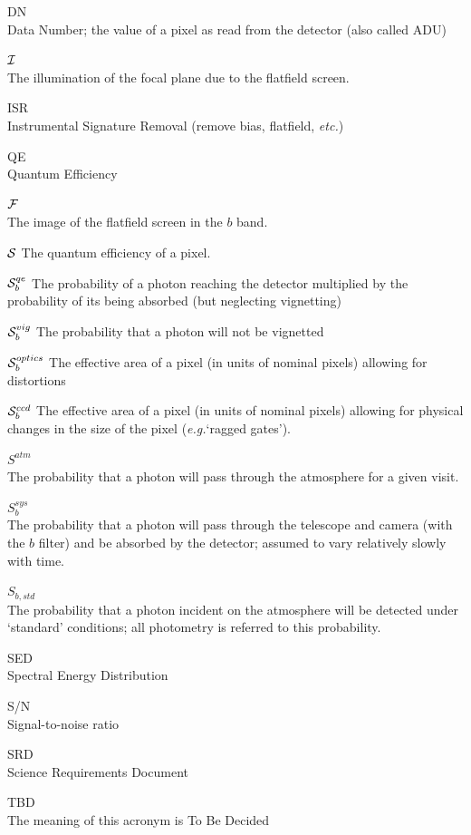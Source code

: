 \documentclass[12pt]{article}
\newcommand{\eg}{\textit{e.g.}\xspace}
\newcommand{\etc}{\textit{etc.}\xspace}
\newcommand{\Flat}{{\cal F}}
\newcommand{\screen}{{\cal I}}
\newcommand{\qe}{{\cal S}}
\begin{document}
\begin{description}
  \item{DN}\\
    Data Number; the value of a pixel as read from the detector (also called ADU)
  \item $\screen$\\
    The illumination of the focal plane due to the flatfield screen.
  \item{ISR}\\
    Instrumental Signature Removal (remove bias, flatfield, \etc)
  \item{QE}\\
    Quantum Efficiency
  \item $\Flat$\\
    The image of the flatfield screen in the $b$ band.
  \item $\qe$
    The quantum efficiency of a pixel.
    \begin{description}
    \item $\qe_b^{qe}$
      The probability of a photon reaching the detector multiplied by the probability
      of its being absorbed (but neglecting vignetting)
    \item $\qe_b^{vig}$
      The probability that a photon will not be vignetted
    \item $\qe_b^{optics}$
      The effective area of a pixel (in units of nominal pixels) allowing for distortions
    \item $\qe_b^{ccd}$
      The effective area of a pixel (in units of nominal pixels) allowing for physical changes
      in the size of the pixel (\eg `ragged gates').
    \end{description}    

  \item $S^{atm}$\\
    The probability that a photon will pass through the atmosphere for a given visit.
  \item $S_b^{sys}$\\
    The probability that a photon will pass through the telescope and camera (with the $b$ filter)
    and be absorbed by the detector;  assumed to vary relatively slowly with time.
  \item $S_{b, std}$\\

    The probability that a photon incident on the atmosphere will be detected under `standard' conditions; all
    photometry is referred to this probability.

  \item{SED}\\
    Spectral Energy Distribution
  \item{S/N}\\
    Signal-to-noise ratio
  \item{SRD}\\
    Science Requirements Document
  \item{TBD}\\
    The meaning of this acronym is To Be Decided
\end{description}
\end{document}
